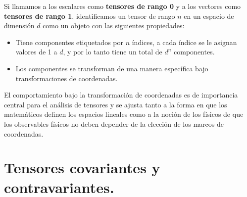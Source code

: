 \par
Si llamamos a los escalares como \textbf{tensores de rango 0} y a los vectores como \textbf{tensores de rango 1}, identificamos un tensor de rango $n$ en un espacio de dimensión $d$ como un objeto con las siguientes propiedades:
\begin{itemize}
\item Tiene componentes etiquetados por $n$ índices, a cada índice se le asignan valores de 1 a $d$, y por lo tanto tiene un total de $d^{n}$ componentes.
\item Los componentes se transforman de una manera específica bajo transformaciones de coordenadas.
\end{itemize}
El comportamiento bajo la transformación de coordenadas es de importancia central para el análisis de tensores y se ajusta tanto a la forma en que los matemáticos definen los espacios lineales como a la noción de los físicos de que los observables físicos no deben depender de la elección de los marcos de coordenadas.

\section{Tensores covariantes y contravariantes.}

